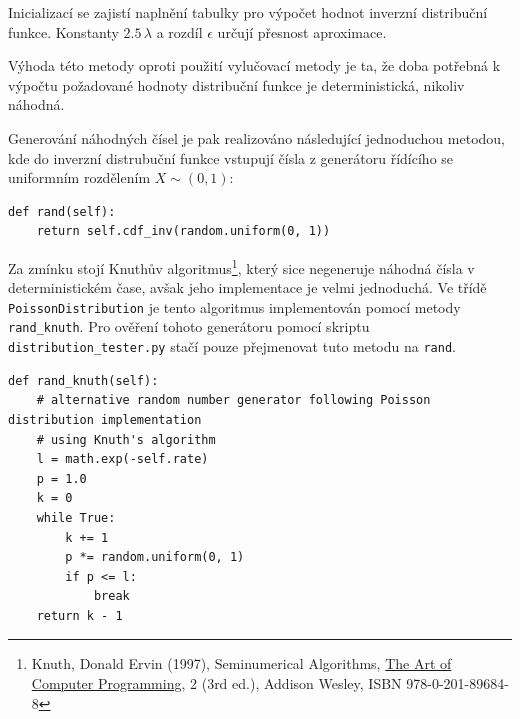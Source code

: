 \documentclass[12pt, a4paper]{article}
\begin{document}
    Inicializací se zajistí naplnění tabulky pro výpočet hodnot inverzní distribuční funkce. Konstanty $2.5\, \lambda$ a
    rozdíl $\epsilon$ určují přesnost aproximace.

    Výhoda této metody oproti použití vylučovací metody je ta, že doba potřebná k výpočtu požadované hodnoty distribuční funkce je
    deterministická, nikoliv náhodná.

    Generování náhodných čísel je pak realizováno následující jednoduchou metodou, kde do inverzní distrubuční funkce vstupují
    čísla z generátoru řídícího se uniformním rozdělením $X \sim (0, 1)$:

    \begin{lstlisting}
def rand(self):
    return self.cdf_inv(random.uniform(0, 1))
    \end{lstlisting}

    Za zmínku stojí Knuthův algoritmus\footnote{Knuth, Donald Ervin (1997), Seminumerical Algorithms, \hyperlink{https://en.wikipedia.org/wiki/The\_Art\_of\_Computer\_Programming}{The Art of Computer Programming}, 2 (3rd ed.), Addison Wesley, ISBN 978-0-201-89684-8}, který sice negeneruje náhodná čísla v deterministickém čase, avšak jeho implementace
    je velmi jednoduchá. Ve třídě \texttt{PoissonDistribution} je tento algoritmus implementován pomocí metody \texttt{rand\_knuth}.
    Pro ověření tohoto generátoru pomocí skriptu \texttt{distribution_tester.py} stačí pouze přejmenovat tuto metodu na \texttt{rand}.

    \pagebreak

    \begin{lstlisting}
def rand_knuth(self):
    # alternative random number generator following Poisson distribution implementation
    # using Knuth's algorithm
    l = math.exp(-self.rate)
    p = 1.0
    k = 0
    while True:
        k += 1
        p *= random.uniform(0, 1)
        if p <= l:
            break
    return k - 1
    \end{lstlisting}
\end{document}

